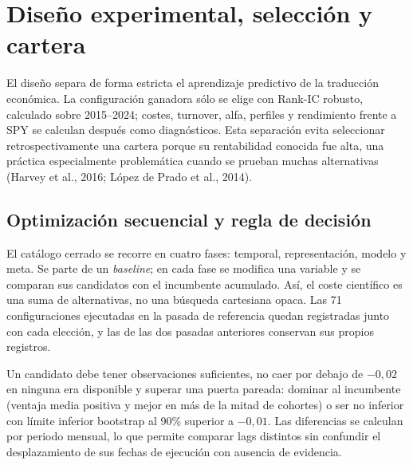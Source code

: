 \chapter{Diseño experimental, selección y cartera}
\label{chap:diseno-experimental}

El diseño separa de forma estricta el aprendizaje predictivo de la traducción económica. La
configuración ganadora sólo se elige con Rank-IC robusto, calculado sobre 2015--2024; costes,
turnover, alfa, perfiles y rendimiento frente a SPY se calculan después como diagnósticos. Esta
separación evita seleccionar retrospectivamente una cartera porque su rentabilidad conocida fue
alta, una práctica especialmente problemática cuando se prueban muchas alternativas
(Harvey et al., 2016; López de Prado et al., 2014).

\section{Optimización secuencial y regla de decisión}

El catálogo cerrado se recorre en cuatro fases: temporal, representación, modelo y meta. Se parte
de un \textit{baseline}; en cada fase se modifica una variable y se comparan sus candidatos con el
incumbente acumulado. Así, el coste científico es una suma de alternativas, no una búsqueda
cartesiana opaca. Las 71 configuraciones ejecutadas en la pasada de referencia quedan registradas
junto con cada elección, y las de las dos pasadas anteriores conservan sus propios registros.

Un candidato debe tener observaciones suficientes, no caer por debajo de $-0,02$ en ninguna era
disponible y superar una puerta pareada: dominar al incumbente (ventaja media positiva y mejor en
más de la mitad de cohortes) o ser no inferior con límite inferior bootstrap al 90\% superior a
$-0,01$. Las diferencias se calculan por periodo mensual, lo que permite comparar lags distintos
sin confundir el desplazamiento de sus fechas de ejecución con ausencia de evidencia.


